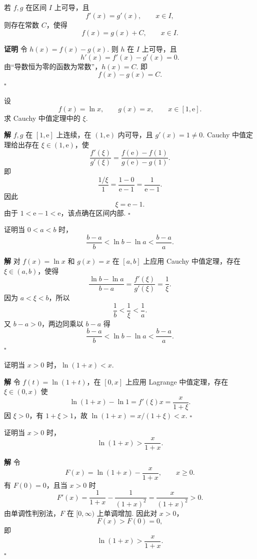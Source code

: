 \documentclass[fontset=fandol]{ctexart}
\newenvironment{proofdetail}{\par\noindent\textbf{证明}\quad}{\hfill$\square$\par\vspace{0.8em}}
\newenvironment{solution}{\par\noindent\textbf{解}\quad}{\hfill$\square$\par\vspace{0.8em}}
\newcommand{\ee}{\mathrm{e}}
\begin{document}
\begin{proposition}[导数相等的函数相差常数]
若 $f,g$ 在区间 $I$ 上可导，且
\[
f'(x)=g'(x),\qquad x\in I,
\]
则存在常数 $C$，使得
\[
f(x)=g(x)+C,\qquad x\in I.
\]
\end{proposition}
\begin{proofdetail}
令 $h(x)=f(x)-g(x)$. 则 $h$ 在 $I$ 上可导，且
\[
h'(x)=f'(x)-g'(x)=0.
\]
由“导数恒为零的函数为常数”，$h(x)=C$. 即
\[
f(x)-g(x)=C.
\]
\end{proofdetail}

\begin{example}
设
\[
f(x)=\ln x,\qquad g(x)=x,\qquad x\in[1,\ee].
\]
求 Cauchy 中值定理中的 $\xi$.
\end{example}
\begin{solution}
$f,g$ 在 $[1,\ee]$ 上连续，在 $(1,\ee)$ 内可导，且 $g'(x)=1\neq0$. Cauchy 中值定理给出存在 $\xi\in(1,\ee)$，使
\[
\frac{f'(\xi)}{g'(\xi)}
=\frac{f(\ee)-f(1)}{g(\ee)-g(1)}.
\]
即
\[
\frac{1/\xi}{1}=\frac{1-0}{\ee-1}=\frac1{\ee-1}.
\]
因此
\[
\xi=\ee-1.
\]
由于 $1<\ee-1<\ee$，该点确在区间内部.
\end{solution}

\begin{example}
证明当 $0<a<b$ 时，
\[
\frac{b-a}{b}<\ln b-\ln a<\frac{b-a}{a}.
\]
\end{example}
\begin{solution}
对 $f(x)=\ln x$ 和 $g(x)=x$ 在 $[a,b]$ 上应用 Cauchy 中值定理，存在 $\xi\in(a,b)$，使得
\[
\frac{\ln b-\ln a}{b-a}=\frac{f'(\xi)}{g'(\xi)}=\frac1{\xi}.
\]
因为 $a<\xi<b$，所以
\[
\frac1b<\frac1\xi<\frac1a.
\]
又 $b-a>0$，两边同乘以 $b-a$ 得
\[
\frac{b-a}{b}<\ln b-\ln a<\frac{b-a}{a}.
\]
\end{solution}

\begin{example}[不等式]
证明当 $x>0$ 时，$\ln(1+x)<x$.
\end{example}
\begin{solution}
令 $f(t)=\ln(1+t)$，在 $[0,x]$ 上应用 Lagrange 中值定理，存在 $\xi\in(0,x)$ 使
\[
\ln(1+x)-\ln1=f'(\xi)x=\frac{x}{1+\xi}.
\]
因 $\xi>0$，有 $1+\xi>1$，故 $\ln(1+x)=x/(1+\xi)<x$.
\end{solution}

\begin{example}[不等式]
证明当 $x>0$ 时，
\[
\ln(1+x)>\frac{x}{1+x}.
\]
\end{example}
\begin{solution}
令
\[
F(x)=\ln(1+x)-\frac{x}{1+x},\qquad x\geq0.
\]
有 $F(0)=0$，且当 $x>0$ 时
\[
F'(x)=\frac1{1+x}-\frac1{(1+x)^2}
=\frac{x}{(1+x)^2}>0.
\]
由单调性判别法，$F$ 在 $[0,\infty)$ 上单调增加. 因此对 $x>0$，
\[
F(x)>F(0)=0,
\]
即
\[
\ln(1+x)>\frac{x}{1+x}.
\]
\end{solution}
\end{document}
